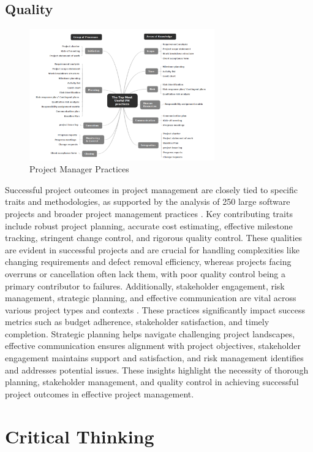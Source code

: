 \documentclass{article}
\begin{document}
\subsection{Quality}

\begin{figure}[htp]
    \centering
    \includegraphics[width=8cm]{Project Manager Practices.png}
    \caption{Project Manager Practices}
    \label{fig:Project Manager Practices}
\end{figure}

Successful project outcomes in project management are closely tied to specific traits and methodologies, as supported by the analysis of 250 large software projects and broader project management practices \cite{jones2004software}. Key contributing traits include robust project planning, accurate cost estimating, effective milestone tracking, stringent change control, and rigorous quality control. These qualities are evident in successful projects and are crucial for handling complexities like changing requirements and defect removal efficiency, whereas projects facing overruns or cancellation often lack them, with poor quality control being a primary contributor to failures. Additionally, stakeholder engagement, risk management, strategic planning, and effective communication are vital across various project types and contexts \cite{fernandes2013identifying}. These practices significantly impact success metrics such as budget adherence, stakeholder satisfaction, and timely completion. Strategic planning helps navigate challenging project landscapes, effective communication ensures alignment with project objectives, stakeholder engagement maintains support and satisfaction, and risk management identifies and addresses potential issues. These insights highlight the necessity of thorough planning, stakeholder management, and quality control in achieving successful project outcomes in effective project management.

\section{Critical Thinking}
\end{document}
